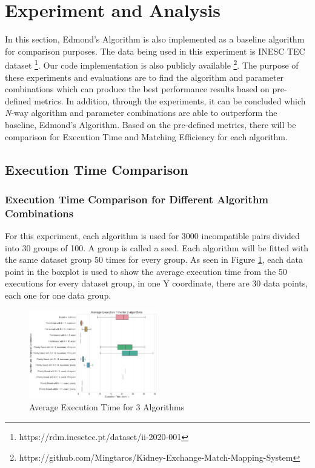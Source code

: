 \documentclass[conference]{IEEEtran}
\begin{document}
\section{Experiment and Analysis}
In this section, Edmond's Algorithm is also implemented as a baseline algorithm for comparison purposes.
The data being used in this experiment is INESC TEC dataset \footnote{https://rdm.inesctec.pt/dataset/ii-2020-001}.
Our code implementation is also publicly available \footnote{https://github.com/Mingtaros/Kidney-Exchange-Match-Mapping-System}.
The purpose of these experiments and evaluations are to find the algorithm and parameter combinations which can produce the best
performance results based on pre-defined metrics. In addition, through the experiments, it can be concluded which \textit{N}-way
algorithm and parameter combinations are able to outperform the baseline, Edmond's Algorithm. Based on the pre-defined metrics,
there will be comparison for Execution Time and Matching Efficiency for each algorithm.

\subsection{Execution Time Comparison}
\subsubsection{Execution Time Comparison for Different Algorithm Combinations}
For this experiment, each algorithm is used for 3000 incompatible pairs divided into 30 groups of 100. A group is called a seed. Each
algorithm will be fitted with the same dataset group 50 times for every group. As seen in Figure \ref{exctimealgo}, each data point in the boxplot
is used to show the average execution time from the 50 executions for every dataset group, in one Y coordinate, there are 30 data
points, each one for one data group. 

\begin{figure}[h]
    \includegraphics[width=0.5\textwidth]{images/average_execution_time_for_3_algorithms.png}
    \caption{Average Execution Time for 3 Algorithms}
    \label{exctimealgo}
\end{figure}
\end{document}
